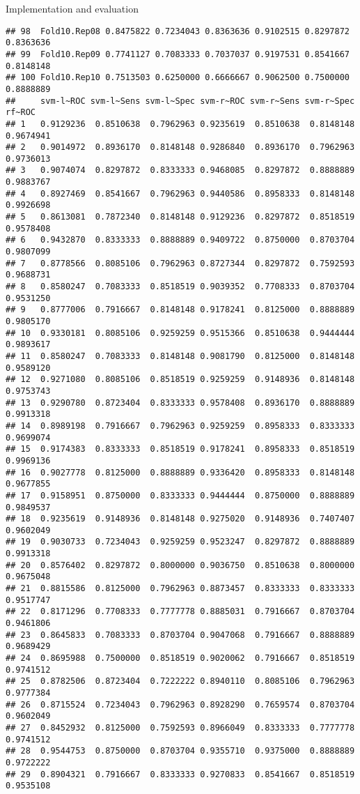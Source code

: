 \documentclass[
  ignorenonframetext,
]{beamer}
\begin{document}
\begin{frame}[fragile]{Implementation and evaluation}
\begin{verbatim}
## 98  Fold10.Rep08 0.8475822 0.7234043 0.8363636 0.9102515 0.8297872 0.8363636
## 99  Fold10.Rep09 0.7741127 0.7083333 0.7037037 0.9197531 0.8541667 0.8148148
## 100 Fold10.Rep10 0.7513503 0.6250000 0.6666667 0.9062500 0.7500000 0.8888889
##     svm-l~ROC svm-l~Sens svm-l~Spec svm-r~ROC svm-r~Sens svm-r~Spec    rf~ROC
## 1   0.9129236  0.8510638  0.7962963 0.9235619  0.8510638  0.8148148 0.9674941
## 2   0.9014972  0.8936170  0.8148148 0.9286840  0.8936170  0.7962963 0.9736013
## 3   0.9074074  0.8297872  0.8333333 0.9468085  0.8297872  0.8888889 0.9883767
## 4   0.8927469  0.8541667  0.7962963 0.9440586  0.8958333  0.8148148 0.9926698
## 5   0.8613081  0.7872340  0.8148148 0.9129236  0.8297872  0.8518519 0.9578408
## 6   0.9432870  0.8333333  0.8888889 0.9409722  0.8750000  0.8703704 0.9807099
## 7   0.8778566  0.8085106  0.7962963 0.8727344  0.8297872  0.7592593 0.9688731
## 8   0.8580247  0.7083333  0.8518519 0.9039352  0.7708333  0.8703704 0.9531250
## 9   0.8777006  0.7916667  0.8148148 0.9178241  0.8125000  0.8888889 0.9805170
## 10  0.9330181  0.8085106  0.9259259 0.9515366  0.8510638  0.9444444 0.9893617
## 11  0.8580247  0.7083333  0.8148148 0.9081790  0.8125000  0.8148148 0.9589120
## 12  0.9271080  0.8085106  0.8518519 0.9259259  0.9148936  0.8148148 0.9753743
## 13  0.9290780  0.8723404  0.8333333 0.9578408  0.8936170  0.8888889 0.9913318
## 14  0.8989198  0.7916667  0.7962963 0.9259259  0.8958333  0.8333333 0.9699074
## 15  0.9174383  0.8333333  0.8518519 0.9178241  0.8958333  0.8518519 0.9969136
## 16  0.9027778  0.8125000  0.8888889 0.9336420  0.8958333  0.8148148 0.9677855
## 17  0.9158951  0.8750000  0.8333333 0.9444444  0.8750000  0.8888889 0.9849537
## 18  0.9235619  0.9148936  0.8148148 0.9275020  0.9148936  0.7407407 0.9602049
## 19  0.9030733  0.7234043  0.9259259 0.9523247  0.8297872  0.8888889 0.9913318
## 20  0.8576402  0.8297872  0.8000000 0.9036750  0.8510638  0.8000000 0.9675048
## 21  0.8815586  0.8125000  0.7962963 0.8873457  0.8333333  0.8333333 0.9517747
## 22  0.8171296  0.7708333  0.7777778 0.8885031  0.7916667  0.8703704 0.9461806
## 23  0.8645833  0.7083333  0.8703704 0.9047068  0.7916667  0.8888889 0.9689429
## 24  0.8695988  0.7500000  0.8518519 0.9020062  0.7916667  0.8518519 0.9741512
## 25  0.8782506  0.8723404  0.7222222 0.8940110  0.8085106  0.7962963 0.9777384
## 26  0.8715524  0.7234043  0.7962963 0.8928290  0.7659574  0.8703704 0.9602049
## 27  0.8452932  0.8125000  0.7592593 0.8966049  0.8333333  0.7777778 0.9741512
## 28  0.9544753  0.8750000  0.8703704 0.9355710  0.9375000  0.8888889 0.9722222
## 29  0.8904321  0.7916667  0.8333333 0.9270833  0.8541667  0.8518519 0.9535108

\end{verbatim}
\end{frame}
\end{document}

